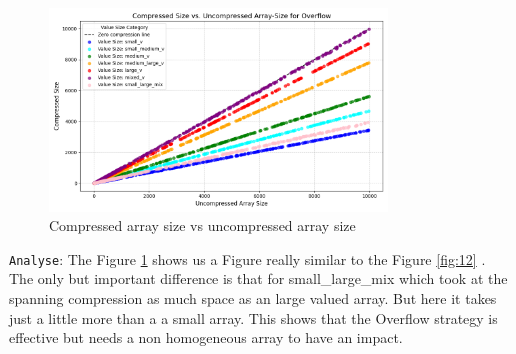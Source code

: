 \documentclass[11pt, a4paper]{article}
\begin{document}
	\begin{figure}[H]%
		\centering
		\includegraphics[width=0.8\textwidth]{Grafics/Overflow/Overflowefficency.png}
		\caption{Compressed array size vs uncompressed array size}
		\label{fig:21}
	\end{figure}
	\texttt{Analyse}: The Figure \ref{fig:21} shows us a Figure really similar to the Figure \ref{fig:12} . The only but important difference is that for small\_large\_mix which took at the spanning compression as much space as an large valued array. But here it takes just a little more than a a small array. This shows that the Overflow strategy is effective but needs a non homogeneous array to have an impact.  
	
\end{document}
